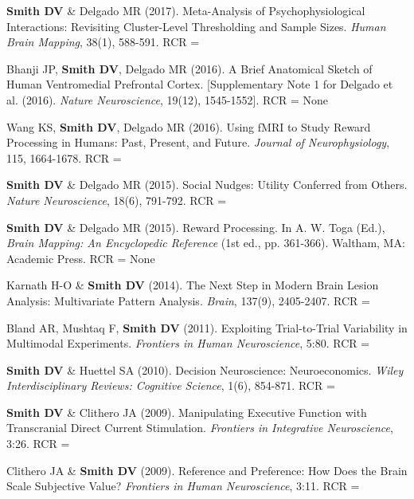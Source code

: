 \documentclass[11pt, letterpaper]{article}
\newcommand{\years}[1]{\marginnote{\scriptsize #1}}
\begin{document}
\begin{hangparas}{.5in}{1}

\years{10.}\textbf{Smith DV} \& Delgado MR (2017). Meta-Analysis of Psychophysiological Interactions: Revisiting Cluster-Level Thresholding and Sample Sizes. \textit{Human Brain Mapping}, 38(1), 588-591. RCR = 

\years{9.}Bhanji JP, \textbf{Smith DV}, Delgado MR (2016). A Brief Anatomical Sketch of Human Ventromedial Prefrontal Cortex. [Supplementary Note 1 for Delgado et al. (2016). \textit{Nature Neuroscience}, 19(12), 1545-1552]. RCR = None

\years{8.}Wang KS, \textbf{Smith DV}, Delgado MR (2016). Using fMRI to Study Reward Processing in Humans: Past, Present, and Future. \textit{Journal of Neurophysiology}, 115, 1664-1678. RCR = 

\years{7.} \textbf{Smith DV} \& Delgado MR (2015). Social Nudges: Utility Conferred from Others. \textit{Nature Neuroscience}, 18(6), 791-792. RCR = 

\years{6.}\textbf{Smith DV} \& Delgado MR (2015). Reward Processing. In A. W. Toga (Ed.), \textit{Brain Mapping: An Encyclopedic Reference} (1st ed., pp. 361-366). Waltham, MA: Academic Press. RCR = None

\years{5.}Karnath H-O \& \textbf{Smith DV} (2014). The Next Step in Modern Brain Lesion Analysis: Multivariate Pattern Analysis. \textit{Brain}, 137(9), 2405-2407. RCR = 

\years{4.}Bland AR, Mushtaq F, \textbf{Smith DV} (2011). Exploiting Trial-to-Trial Variability in Multimodal Experiments. \textit{Frontiers in Human Neuroscience}, 5:80. RCR = 

\years{3.}\textbf{Smith DV} \& Huettel SA (2010). Decision Neuroscience: Neuroeconomics. \textit{Wiley Interdisciplinary Reviews: Cognitive Science}, 1(6), 854-871. RCR = 

\years{2.}\textbf{Smith DV} \& Clithero JA (2009). Manipulating Executive Function with Transcranial Direct Current Stimulation. \textit{Frontiers in Integrative Neuroscience}, 3:26. RCR = 

\years{1.}Clithero JA \& \textbf{Smith DV} (2009). Reference and Preference: How Does the Brain Scale Subjective Value? \textit{Frontiers in Human Neuroscience}, 3:11. RCR =  \\ [.5cm]


\end{hangparas}
\end{document}
